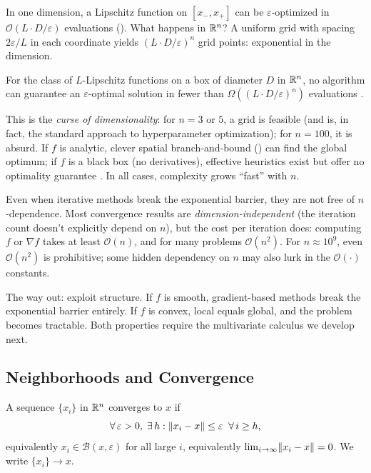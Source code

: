 In one dimension, a Lipschitz function on $[x_-, x_+]$ can be $\varepsilon$-optimized in $\mathcal{O}(L \cdot D/\varepsilon)$ evaluations ().
What happens in $\mathbb{R}^n$?
A uniform grid with spacing $2\varepsilon/L$ in each coordinate yields $(L\cdot D/\varepsilon)^n$ grid points: exponential in the dimension.

\begin{theorem}\label{thm:multivariate-lip}
	For the class of $L$-Lipschitz functions on a box of diameter $D$ in $\mathbb{R}^n$, no algorithm can guarantee an $\varepsilon$-optimal solution in fewer than $\Omega((L \cdot D / \varepsilon)^n)$ evaluations \cite{hansen1995}.
\end{theorem}

This is the \emph{curse of dimensionality}: for $n = 3$ or $5$, a grid is feasible (and is, in fact, the standard approach to hyperparameter optimization); for $n = 100$, it is absurd.
If $f$ is analytic, clever spatial branch-and-bound () can find the global optimum; if $f$ is a black box (no derivatives), effective heuristics exist but offer no optimality guarantee \cite{serafino2014}.
In all cases, complexity grows ``fast'' with $n$.

Even when iterative methods break the exponential barrier, they are not free of $n$-dependence.
Most convergence results are \emph{dimension-independent} (the iteration count doesn't explicitly depend on $n$), but the cost per iteration does: computing $f$ or $\nabla f$ takes at least $\mathcal{O}(n)$, and for many problems $\mathcal{O}(n^2)$.
For $n \approx 10^9$, even $\mathcal{O}(n^2)$ is prohibitive; some hidden dependency on $n$ may also lurk in the $\mathcal{O}(\cdot)$ constants.

The way out: exploit structure.
If $f$ is smooth, gradient-based methods break the exponential barrier entirely.
If $f$ is convex, local equals global, and the problem becomes tractable.
Both properties require the multivariate calculus we develop next.


\subsection{Neighborhoods and Convergence}\label{sec:convergence}

\begin{definition}\label{def:convergence}
	A sequence $\{x_i\}$ in $\mathbb{R}^n$ converges to $x$ if
	\begin{equation}\label{eq:convergence}
		\forall\, \varepsilon > 0,\; \exists\, h : \lVert x_i - x\rVert \leq \varepsilon \;\;\forall\, i \geq h,
	\end{equation}
	equivalently $x_i \in \mathcal{B}(x, \varepsilon)$ for all large $i$, equivalently $\lim_{i \to \infty} \lVert x_i - x\rVert = 0$.
	We write $\{x_i\} \to x$.
\end{definition}

